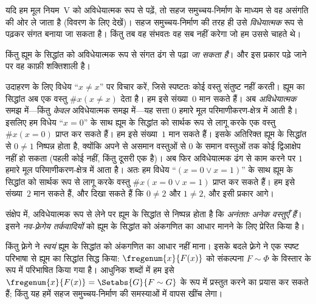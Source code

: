 \documentclass[../../../include/open-logic-section]{subfiles}
\begin{document}
यदि हम मूल नियम~V को अविधेयात्मक रूप से पढ़ें, तो सहज समुच्चय-निर्माण के
माध्यम से वह असंगति की ओर ले जाता है (विवरण के लिए
 देखें)। सहज समुच्चय-निर्माण की तरह ही उसे
\emph{विधेयात्मक} रूप से पढ़कर संगत बनाया जा सकता है। किंतु तब वह संभवतः वह
सब नहीं करेगा जो हम उससे चाहते थे।

किंतु ह्यूम के सिद्धांत को अविधेयात्मक रूप से संगत ढंग से पढ़ा \emph{जा
सकता है}। और इस प्रकार पढ़े जाने पर वह काफ़ी शक्तिशाली है।

उदाहरण के लिए विधेय ``$x\neq x$'' पर विचार करें, जिसे स्पष्टतः कोई वस्तु
संतुष्ट नहीं करती। ह्यूम का सिद्धांत अब एक वस्तु $\#x(x\neq x)$ देता है।
हम इसे संख्या~$0$ मान सकते हैं। अब \emph{अविधेयात्मक} समझ में---किंतु
\emph{केवल} अविधेयात्मक समझ में---यह सत्ता $0$ हमारे मूल परिमाणीकरण-क्षेत्र
में आती है। इसलिए हम विधेय ``$x=0$'' के साथ ह्यूम के सिद्धांत को सार्थक रूप
से लागू करके एक वस्तु $\#x(x=0)$ प्राप्त कर सकते हैं। हम इसे संख्या~$1$
मान सकते हैं। इसके अतिरिक्त ह्यूम के सिद्धांत से $0\neq1$ निष्पन्न होता है,
क्योंकि अपने से असमान वस्तुओं से $0$ के समान वस्तुओं तक कोई द्विआक्षेप नहीं
हो सकता (पहली कोई नहीं, किंतु दूसरी एक है)। अब फिर अविधेयात्मक ढंग से काम
करने पर $1$ हमारे मूल परिमाणीकरण-क्षेत्र में आता है। अतः हम विधेय
``$(x=0\lor x=1)$'' के साथ ह्यूम के सिद्धांत को सार्थक रूप से लागू करके
वस्तु $\#x(x=0\lor x=1)$ प्राप्त कर सकते हैं। हम इसे संख्या~$2$ मान सकते
हैं, और दिखा सकते हैं कि $0\neq2$ और $1\neq2$, और इसी प्रकार आगे।

संक्षेप में, अविधेयात्मक रूप से लेने पर ह्यूम के सिद्धांत से निष्पन्न होता
है कि \emph{अनंततः अनेक वस्तुएँ हैं}। इसने \emph{नव-फ़्रेगेय
तर्कवादियों} को ह्यूम के सिद्धांत को अंकगणित का आधार मानने के लिए प्रेरित
किया है।

किंतु फ़्रेगे ने \emph{स्वयं} ह्यूम के सिद्धांत को अंकगणित का आधार नहीं
माना। इसके बदले फ़्रेगे ने एक स्पष्ट परिभाषा से ह्यूम का सिद्धांत सिद्ध
किया: $\fregenum{x}{F(x)}$ को संकल्पना $F\sim\Phi$ के विस्तार के रूप में
परिभाषित किया गया है। आधुनिक शब्दों में हम इसे
$\fregenum{x}{F(x)}=\Setabs{G}{F\sim G}$ के रूप में प्रस्तुत करने का प्रयास
कर सकते हैं; किंतु यह हमें सहज समुच्चय-निर्माण की समस्याओं में वापस खींच
लेगा।
\end{document}
